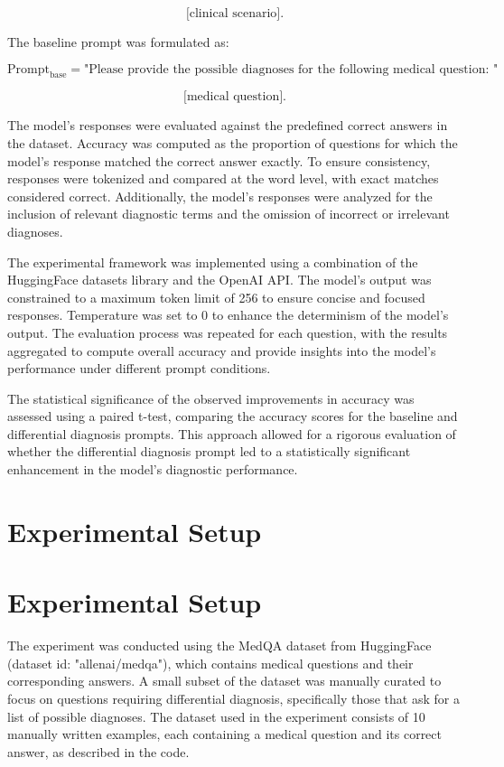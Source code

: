 \documentclass{article}
\begin{document}
$$
\text{[clinical scenario]}.
$$

The baseline prompt was formulated as:

$$
\text{Prompt}_{\text{base}} = \text{"Please provide the possible diagnoses for the following medical question: "}
$$

$$
\text{[medical question]}.
$$

The model's responses were evaluated against the predefined correct answers in the dataset. Accuracy was computed as the proportion of questions for which the model's response matched the correct answer exactly. To ensure consistency, responses were tokenized and compared at the word level, with exact matches considered correct. Additionally, the model's responses were analyzed for the inclusion of relevant diagnostic terms and the omission of incorrect or irrelevant diagnoses.

The experimental framework was implemented using a combination of the HuggingFace datasets library and the OpenAI API. The model's output was constrained to a maximum token limit of 256 to ensure concise and focused responses. Temperature was set to 0 to enhance the determinism of the model's output. The evaluation process was repeated for each question, with the results aggregated to compute overall accuracy and provide insights into the model's performance under different prompt conditions.

The statistical significance of the observed improvements in accuracy was assessed using a paired t-test, comparing the accuracy scores for the baseline and differential diagnosis prompts. This approach allowed for a rigorous evaluation of whether the differential diagnosis prompt led to a statistically significant enhancement in the model's diagnostic performance.
\section{Experimental Setup}
\section{Experimental Setup}

The experiment was conducted using the MedQA dataset from HuggingFace (dataset id: "allenai/medqa"), which contains medical questions and their corresponding answers. A small subset of the dataset was manually curated to focus on questions requiring differential diagnosis, specifically those that ask for a list of possible diagnoses. The dataset used in the experiment consists of 10 manually written examples, each containing a medical question and its correct answer, as described in the code.
\end{document}
